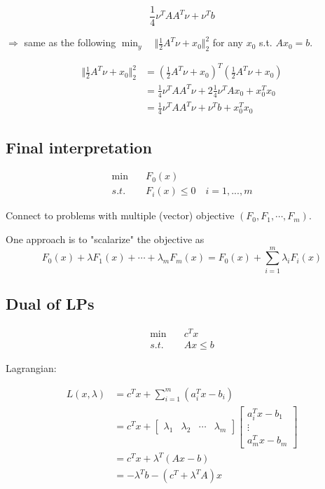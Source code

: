\begin{equation*}
	\frac{1}{4}\nu^TAA^T\nu+\nu^Tb
\end{equation*}

$\Rightarrow$ same as the following $\min_y\quad \Vert\frac{1}{2}A^T\nu + x_0\Vert^2_2$ for any $x_0$ s.t. $Ax_0 = b$.

\begin{align*}
	\Vert \frac{1}{2}A^T\nu + x_0\Vert_2^2 &= (\frac{1}{2}A^T\nu+x_0)^T(\frac{1}{2}A^T\nu+x_0)\\
	&= \frac{1}{4}\nu^TAA^T\nu + 2\frac{1}{4}\nu^TAx_0 + x_0^Tx_0\\
	&= \frac{1}{4}\nu^TAA^T\nu + \nu^Tb+x_0^Tx_0
\end{align*}

\subsection{Final interpretation}
\begin{align*}
	\min \quad & F_0(x)\\
	s.t. \quad & F_i(x)\leq 0\quad i = 1,...,m
\end{align*}

Connect to problems with multiple (vector) objective $(F_0,F_1,\cdots,F_m)$.

One approach is to "scalarize" the objective as 
\begin{equation*}
	F_0(x) + \lambda F_1(x) + \cdots + \lambda_mF_m(x) = F_0(x) + \sum^m_{i=1}\lambda_iF_i(x)
\end{equation*}






\subsection{Dual of LPs}

\begin{align*}
\min\quad &c^Tx\\
s.t.\quad &Ax\leq b
\end{align*}

Lagrangian: 

\begin{align*}
L(x,\lambda) &= c^Tx + \sum^m_{i=1}(a_i^Tx-b_i)\\
&= c^Tx+\begin{bmatrix}
\lambda_1&\lambda_2&\cdots&\lambda_m
\end{bmatrix}\begin{bmatrix}
a_i^Tx-b_1\\
\vdots\\
a_m^Tx-b_m
\end{bmatrix} \\
&=c^Tx+\lambda^T(Ax-b)\\
&= -\lambda^Tb-(c^T+\lambda^TA)x
\end{align*}

